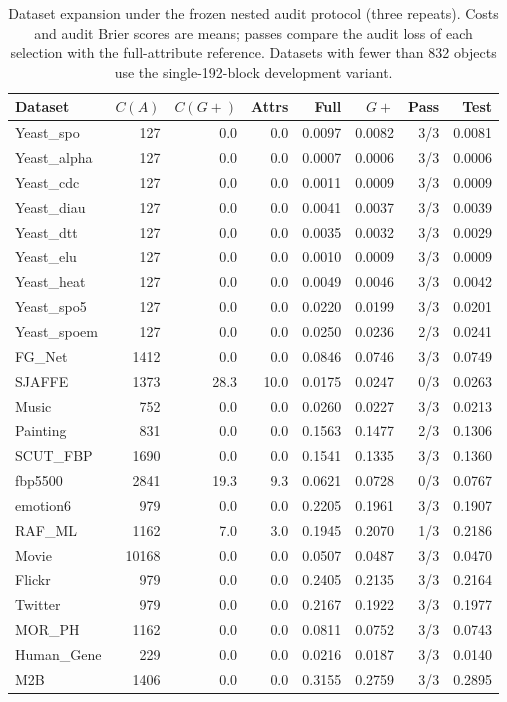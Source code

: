 \begin{table}[htbp]
\centering\scriptsize\renewcommand{\arraystretch}{1.15}\setlength{\tabcolsep}{3.5pt}
\caption{Dataset expansion under the frozen nested audit protocol (three repeats). Costs and audit Brier scores are means; passes compare the audit loss of each selection with the full-attribute reference. Datasets with fewer than 832 objects use the single-192-block development variant.}
\label{tab:expansion-main}
\begin{tabular}{lrrrrrrr}\hline
Dataset & $C(A)$ & $C(G+)$ & Attrs & Full & $G+$ & Pass & Test\\\hline
Yeast\_spo & 127 & 0.0 & 0.0 & 0.0097 & 0.0082 & 3/3 & 0.0081\\
Yeast\_alpha & 127 & 0.0 & 0.0 & 0.0007 & 0.0006 & 3/3 & 0.0006\\
Yeast\_cdc & 127 & 0.0 & 0.0 & 0.0011 & 0.0009 & 3/3 & 0.0009\\
Yeast\_diau & 127 & 0.0 & 0.0 & 0.0041 & 0.0037 & 3/3 & 0.0039\\
Yeast\_dtt & 127 & 0.0 & 0.0 & 0.0035 & 0.0032 & 3/3 & 0.0029\\
Yeast\_elu & 127 & 0.0 & 0.0 & 0.0010 & 0.0009 & 3/3 & 0.0009\\
Yeast\_heat & 127 & 0.0 & 0.0 & 0.0049 & 0.0046 & 3/3 & 0.0042\\
Yeast\_spo5 & 127 & 0.0 & 0.0 & 0.0220 & 0.0199 & 3/3 & 0.0201\\
Yeast\_spoem & 127 & 0.0 & 0.0 & 0.0250 & 0.0236 & 2/3 & 0.0241\\
FG\_Net & 1412 & 0.0 & 0.0 & 0.0846 & 0.0746 & 3/3 & 0.0749\\
SJAFFE & 1373 & 28.3 & 10.0 & 0.0175 & 0.0247 & 0/3 & 0.0263\\
Music & 752 & 0.0 & 0.0 & 0.0260 & 0.0227 & 3/3 & 0.0213\\
Painting & 831 & 0.0 & 0.0 & 0.1563 & 0.1477 & 2/3 & 0.1306\\
SCUT\_FBP & 1690 & 0.0 & 0.0 & 0.1541 & 0.1335 & 3/3 & 0.1360\\
fbp5500 & 2841 & 19.3 & 9.3 & 0.0621 & 0.0728 & 0/3 & 0.0767\\
emotion6 & 979 & 0.0 & 0.0 & 0.2205 & 0.1961 & 3/3 & 0.1907\\
RAF\_ML & 1162 & 7.0 & 3.0 & 0.1945 & 0.2070 & 1/3 & 0.2186\\
Movie & 10168 & 0.0 & 0.0 & 0.0507 & 0.0487 & 3/3 & 0.0470\\
Flickr & 979 & 0.0 & 0.0 & 0.2405 & 0.2135 & 3/3 & 0.2164\\
Twitter & 979 & 0.0 & 0.0 & 0.2167 & 0.1922 & 3/3 & 0.1977\\
MOR\_PH & 1162 & 0.0 & 0.0 & 0.0811 & 0.0752 & 3/3 & 0.0743\\
Human\_Gene & 229 & 0.0 & 0.0 & 0.0216 & 0.0187 & 3/3 & 0.0140\\
M2B & 1406 & 0.0 & 0.0 & 0.3155 & 0.2759 & 3/3 & 0.2895\\
\hline\end{tabular}\end{table}